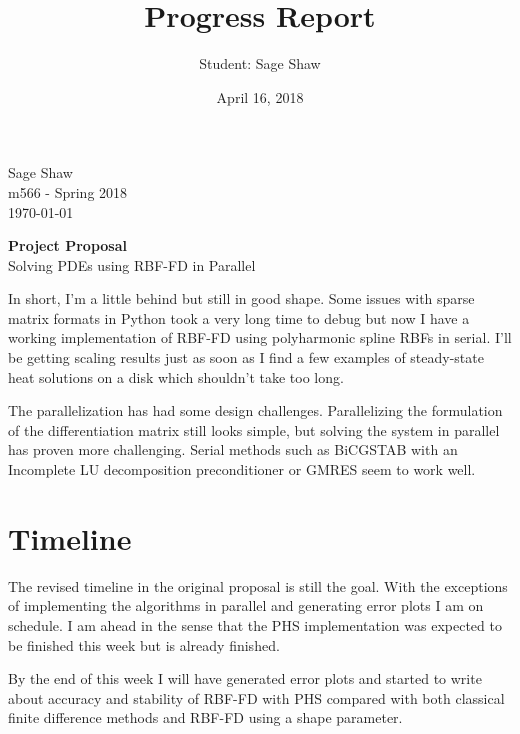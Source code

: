 \documentclass[12pt]{article}
\title{Progress Report}
\author{Student: Sage Shaw}
\date{April 16, 2018}
\begin{document}
	\thispagestyle{empty}
	
	\begin{flushright}
		Sage Shaw \\
		m566 - Spring 2018 \\
		\today
	\end{flushright}
	
	\begin{center}
		\Huge \textbf{Project Proposal} \\
		\large Solving PDEs using RBF-FD in Parallel
	\end{center}

In short, I'm a little behind but still in good shape. Some issues with sparse matrix formats in Python took a very long time to debug but now I have a working implementation of RBF-FD using polyharmonic spline RBFs in serial. I'll be getting scaling results just as soon as I find a few examples of steady-state heat solutions on a disk which shouldn't take too long.

The parallelization has had some design challenges. Parallelizing the formulation of the differentiation matrix still looks simple, but solving the system in parallel has proven more challenging. Serial methods such as BiCGSTAB with an Incomplete LU decomposition preconditioner or GMRES seem to work well.

\section{Timeline}
	The revised timeline in the original proposal is still the goal. With the exceptions of implementing the algorithms in parallel and generating error plots I am on schedule. I am ahead in the sense that the PHS implementation was expected to be finished this week but is already finished. 
	
	By the end of this week I will have generated error plots and started to write about accuracy and stability of RBF-FD with PHS compared with both classical finite difference methods and RBF-FD using a shape parameter. 
	
\end{document}
